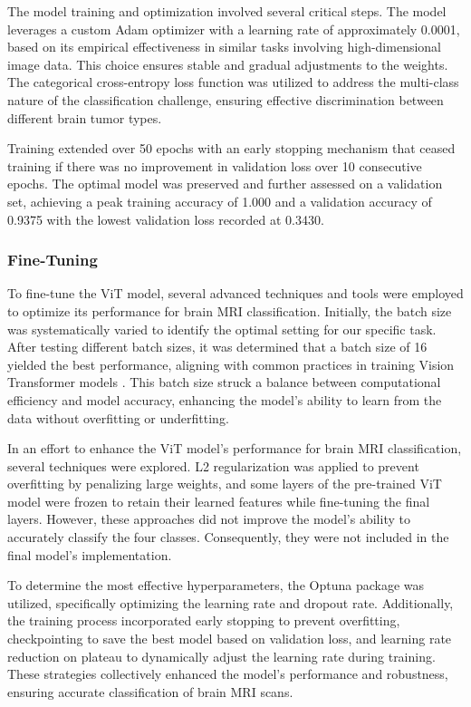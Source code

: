 The model training and optimization involved several critical steps. The model leverages a custom Adam optimizer with a learning rate of approximately 0.0001, based on its empirical effectiveness in similar tasks involving high-dimensional image data. This choice ensures stable and gradual adjustments to the weights. The categorical cross-entropy loss function was utilized to address the multi-class nature of the classification challenge, ensuring effective discrimination between different brain tumor types. 

Training extended over 50 epochs with an early stopping mechanism that ceased training if there was no improvement in validation loss over 10 consecutive epochs. The optimal model was preserved and further assessed on a validation set, achieving a peak training accuracy of 1.000 and a validation accuracy of 0.9375 with the lowest validation loss recorded at 0.3430.


\subsubsection{Fine-Tuning}

To fine-tune the ViT model, several advanced techniques and tools were employed to optimize its performance for brain MRI classification. Initially, the batch size was systematically varied to identify the optimal setting for our specific task. After testing different batch sizes, it was determined that a batch size of 16 yielded the best performance, aligning with common practices in training Vision Transformer models \cite{Al-Hadhrami2023An}. This batch size struck a balance between computational efficiency and model accuracy, enhancing the model's ability to learn from the data without overfitting or underfitting.


In an effort to enhance the ViT model's performance for brain MRI classification, several techniques were explored. L2 regularization was applied to prevent overfitting by penalizing large weights, and some layers of the pre-trained ViT model were frozen to retain their learned features while fine-tuning the final layers. However, these approaches did not improve the model's ability to accurately classify the four classes. Consequently, they were not included in the final model's implementation.

To determine the most effective hyperparameters, the Optuna package was utilized, specifically optimizing the learning rate and dropout rate. Additionally, the training process incorporated early stopping to prevent overfitting, checkpointing to save the best model based on validation loss, and learning rate reduction on plateau to dynamically adjust the learning rate during training. These strategies collectively enhanced the model's performance and robustness, ensuring accurate classification of brain MRI scans.

